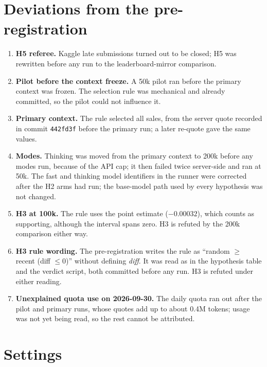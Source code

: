 \documentclass[11pt,a4paper]{article}
\begin{document}
\section{Deviations from the pre-registration}
\label{app:dev}

\begin{enumerate}
\item \textbf{H5 referee.} Kaggle late submissions turned out to be closed; H5 was rewritten before any run to the leaderboard-mirror comparison.
\item \textbf{Pilot before the context freeze.} A 50k pilot ran before the primary context was frozen. The selection rule was mechanical and already committed, so the pilot could not influence it.
\item \textbf{Primary context.} The rule selected all sales, from the server quote recorded in commit \texttt{442fd3f} before the primary run; a later re-quote gave the same values.
\item \textbf{Modes.} Thinking was moved from the primary context to 200k before any modes run, because of the API cap; it then failed twice server-side and ran at 50k. The fast and thinking model identifiers in the runner were corrected after the H2 arms had run; the base-model path used by every hypothesis was not changed.
\item \textbf{H3 at 100k.} The rule uses the point estimate ($-0.00032$), which counts as supporting, although the interval spans zero. H3 is refuted by the 200k comparison either way.
\item \textbf{H3 rule wording.} The pre-registration writes the rule as ``random $\geq$ recent (diff $\leq 0$)'' without defining \emph{diff}. It was read as in the hypothesis table and the verdict script, both committed before any run. H3 is refuted under either reading.
\item \textbf{Unexplained quota use on 2026-09-30.} The daily quota ran out after the pilot and primary runs, whose quotes add up to about 0.4M tokens; usage was not yet being read, so the rest cannot be attributed.
\end{enumerate}

\section{Settings}
\end{document}
